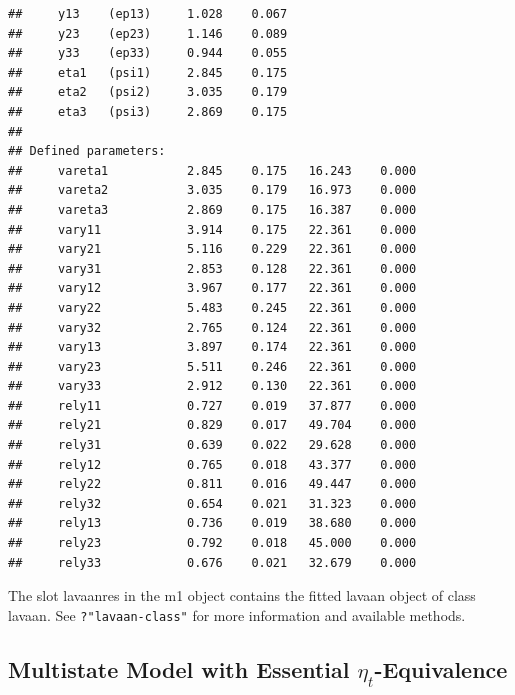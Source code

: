 \documentclass[10pt]{article}\usepackage{graphicx, color}
\makeatletter
\newenvironment{kframe}{%
 \def\at@end@of@kframe{}%
 \ifinner\ifhmode%
  \def\at@end@of@kframe{\end{minipage}}%
  \begin{minipage}{\columnwidth}%
 \fi\fi%
 \def\FrameCommand##1{\hskip\@totalleftmargin \hskip-\fboxsep
 \colorbox{shadecolor}{##1}\hskip-\fboxsep
     \hskip-\linewidth \hskip-\@totalleftmargin \hskip\columnwidth}%
 \MakeFramed {\advance\hsize-\width
   \@totalleftmargin\z@ \linewidth\hsize
   \@setminipage}}%
 {\par\unskip\endMakeFramed%
 \at@end@of@kframe}
\newenvironment{knitrout}{}{} %
\makeatother
\begin{document}
\begin{knitrout}
\begin{kframe}
\begin{verbatim}
##     y13    (ep13)     1.028    0.067
##     y23    (ep23)     1.146    0.089
##     y33    (ep33)     0.944    0.055
##     eta1   (psi1)     2.845    0.175
##     eta2   (psi2)     3.035    0.179
##     eta3   (psi3)     2.869    0.175
## 
## Defined parameters:
##     vareta1           2.845    0.175   16.243    0.000
##     vareta2           3.035    0.179   16.973    0.000
##     vareta3           2.869    0.175   16.387    0.000
##     vary11            3.914    0.175   22.361    0.000
##     vary21            5.116    0.229   22.361    0.000
##     vary31            2.853    0.128   22.361    0.000
##     vary12            3.967    0.177   22.361    0.000
##     vary22            5.483    0.245   22.361    0.000
##     vary32            2.765    0.124   22.361    0.000
##     vary13            3.897    0.174   22.361    0.000
##     vary23            5.511    0.246   22.361    0.000
##     vary33            2.912    0.130   22.361    0.000
##     rely11            0.727    0.019   37.877    0.000
##     rely21            0.829    0.017   49.704    0.000
##     rely31            0.639    0.022   29.628    0.000
##     rely12            0.765    0.018   43.377    0.000
##     rely22            0.811    0.016   49.447    0.000
##     rely32            0.654    0.021   31.323    0.000
##     rely13            0.736    0.019   38.680    0.000
##     rely23            0.792    0.018   45.000    0.000
##     rely33            0.676    0.021   32.679    0.000
\end{verbatim}
\end{kframe}
\end{knitrout}

%
The slot lavaanres in the m1 object contains the fitted lavaan object of class lavaan. See \texttt{?"lavaan-class"} for more information and available methods.


\subsection{Multistate Model with Essential $\eta_t$-Equivalence}
\end{document}

